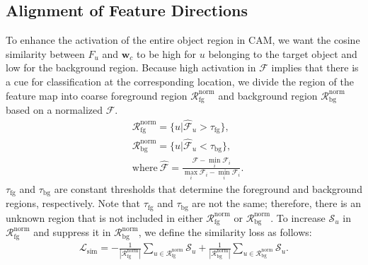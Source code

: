 \subsection{Alignment of Feature Directions}\label{sec:feature_directions}
To enhance the activation of the entire object region in CAM, we want the cosine similarity between $F_u$ and $\mathbf{w}_{c}$ to be high for $u$ belonging to the target object and low for the background region.
Because high activation in $\mathcal{F}$ implies that there is a cue for classification at the corresponding location, we divide the region of the feature map into coarse foreground region $\mathcal{R}^\text{norm}_\text{fg}$ and background region $\mathcal{R}^\text{norm}_\text{bg}$ based on a normalized $\mathcal{F}$.
\begin{equation}
\begin{aligned}
&\mathcal{R}^\text{norm}_\text{fg}=\{u|\hat{\mathcal{F}}_u>\tau_\text{fg}\},\\
&\mathcal{R}^\text{norm}_\text{bg}=\{u|\hat{\mathcal{F}}_u<\tau_\text{bg}\},\\
&\text{where}~\hat{\mathcal{F}}=\frac{\mathcal{F}-\min_{i}{\mathcal{F}_i}}{\max_{i}{\mathcal{F}_i}-\min_{i}{\mathcal{F}_i}}.
\end{aligned}
\end{equation}
$\tau_\text{fg}$ and $\tau_\text{bg}$ are constant thresholds that determine the foreground and background regions, respectively. Note that $\tau_\text{fg}$ and $\tau_\text{bg}$ are not the same; therefore, there is an unknown region that is not included in either $\mathcal{R}^\text{norm}_\text{fg}$ or $\mathcal{R}^\text{norm}_\text{bg}$.
To increase $\mathcal{S}_u$ in $\mathcal{R}^\text{norm}_\text{fg}$ and suppress it in $\mathcal{R}^\text{norm}_\text{bg}$, we define the similarity loss as follows:
\begin{equation}\label{eq:loss_sim}
\begin{aligned}
\mathcal{L}_\text{sim} = -\frac{1}{|\mathcal{R}^\text{norm}_\text{fg}|}\sum_{u\in \mathcal{R}^\text{norm}_\text{fg}}{\mathcal{S}_u} +\frac{1}{|\mathcal{R}^\text{norm}_\text{bg}|}\sum_{u\in \mathcal{R}^\text{norm}_\text{bg}}{\mathcal{S}_u}.
\end{aligned}
\end{equation}

